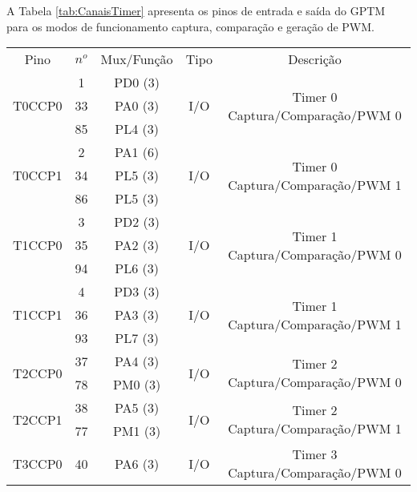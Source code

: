 A Tabela \ref{tab:CanaisTimer} apresenta os pinos de entrada e saída do GPTM para os modos de funcionamento captura, comparação e geração de PWM.

\begin{center}
	\begin{longtable}{|c|c|c|c|c|}
		\rowcolor[HTML]{000000}
		{\color[HTML]{FFFFFF} Pino} & {\color[HTML]{FFFFFF} $n^{o}$} & {\color[HTML]{FFFFFF} Mux/Função} & {\color[HTML]{FFFFFF} Tipo} & {\color[HTML]{FFFFFF} Descrição}            \\
		\multirow{3}{*}{T0CCP0}    & 1   & PD0 (3) & \multirow{3}{*}{I/O} & \multirow{3}{*}{Timer 0 Captura/Comparação/PWM 0}\\
		& 33  & PA0 (3) &     &                                 \\
		& 85  & PL4 (3) &     &                                 \\ \hline
		\multirow{3}{*}{T0CCP1}    & 2   & PA1 (6) & \multirow{3}{*}{I/O} & \multirow{3}{*}{Timer 0 Captura/Comparação/PWM 1}\\
		& 34  & PL5 (3) &     &                                 \\
		& 86  & PL5 (3) &     &                                 \\ \hline
		\multirow{3}{*}{T1CCP0}    & 3   & PD2 (3) & \multirow{3}{*}{I/O} & \multirow{3}{*}{Timer 1 Captura/Comparação/PWM 0}\\
		& 35  & PA2 (3) &     &                                 \\
		& 94  & PL6 (3) &     &                                 \\ \hline
		\multirow{3}{*}{T1CCP1}    & 4   & PD3 (3) & \multirow{3}{*}{I/O} & \multirow{3}{*}{Timer 1 Captura/Comparação/PWM 1}\\
		& 36  & PA3 (3) &     &                                 \\
		& 93  & PL7 (3) &     &                                 \\ \hline
		\multirow{2}{*}{T2CCP0}   & 37  & PA4 (3) & \multirow{2}{*}{I/O} & \multirow{2}{*}{Timer 2 Captura/Comparação/PWM 0}\\
		& 78  & PM0 (3) &     &                                 \\ \hline
		\multirow{2}{*}{T2CCP1}    & 38  & PA5 (3) & \multirow{2}{*}{I/O} & \multirow{2}{*}{Timer 2 Captura/Comparação/PWM 1}\\
		& 77  & PM1 (3) &     &                                 \\ \hline
		\multirow{3}{*}{T3CCP0}    & 40  & PA6 (3) & \multirow{3}{*}{I/O} & \multirow{3}{*}{Timer 3 Captura/Comparação/PWM 0}\\

\end{longtable}
\end{center}
